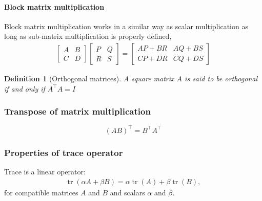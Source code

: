 \documentclass[twocolumn]{article}
\newtheorem{defn}{Definition}
\DeclareMathOperator{\tr}{tr}
\begin{document}
\paragraph{Block matrix  multiplication}
Block matrix multiplication works in a similar way  as scalar multiplication as
long as sub-matrix multiplication is properly defined,
%
\begin{align}
  \begin{bmatrix}  A & B \\  C &  D \end{bmatrix}
  \begin{bmatrix}  P & Q \\  R &  S \end{bmatrix}
 =
   \begin{bmatrix}  AP+BR & AQ+BS \\  CP+DR &  CQ+DS \end{bmatrix}
  \end{align}

\begin{defn}[Orthogonal matrices]
  A square matrix $A$ is said to be orthogonal if and only if $A^\top A = I$
\end{defn}

\subsubsection{Transpose of matrix multiplication}
\[
  (AB)^\top = B^\top A^\top
  \]

\subsubsection{Properties of trace  operator}
Trace is a linear operator:
\begin{align}
  \tr(\alpha A  +  \beta B) = \alpha \tr(A) +  \beta \tr(B),
\end{align}
for compatible matrices  $A$ and $B$   and scalars $\alpha$ and $\beta$.
\end{document}
